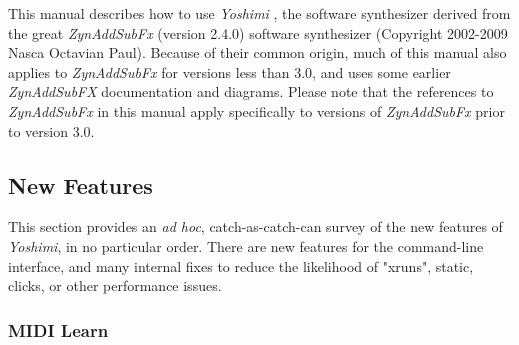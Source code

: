 \documentclass[
 11pt,
 twoside,
 a4paper,
 final                                 %
]{article}
\begin{document}
   This manual describes how to use \textsl{Yoshimi} \cite{yoshimi},
   the software synthesizer derived from the great
   \textsl{ZynAddSubFx} (version 2.4.0) \cite{zynaddsubfx} software
   synthesizer (Copyright 2002-2009 Nasca Octavian Paul).
   Because of their common origin, much of this manual also
   applies to \textsl{ZynAddSubFx} for versions less than 3.0,
   and uses some earlier \textsl{ZynAddSubFX} documentation and diagrams.
   Please note that the references to \textsl{ZynAddSubFx}
   in this manual apply specifically to versions of \textsl{ZynAddSubFx}
   prior to version 3.0.

%
%

\subsection{New Features}
\label{subsec:introduction_new_features}

   This section provides an \textsl{ad hoc}, catch-as-catch-can survey of the
   new features of \textsl{Yoshimi}, in no particular order.
   There are new features for the command-line interface, and many internal
   fixes to reduce the likelihood of "xruns", static, clicks, or other
   performance issues.

\subsubsection{MIDI Learn}
\label{subsubsec:new_features_midi_learn}
\end{document}
